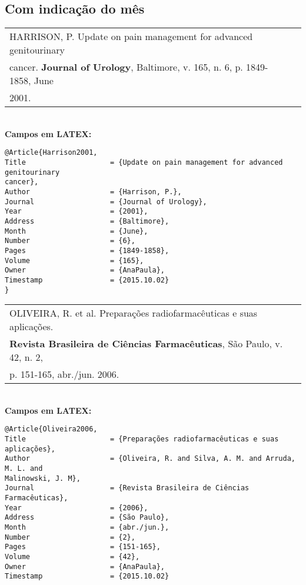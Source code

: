 \subsection{Com indicação do mês}

\begin{tabular}{|l|c|} \hline
HARRISON, P. Update on pain management for advanced genitourinary	\\cancer. \textbf{Journal of Urology}, Baltimore, v. 165, n. 6, p. 1849-1858, June \\2001. 
	\\\hline
\end{tabular} \\

\textbf{Campos em LATEX:} 

\begin{verbatim}
@Article{Harrison2001,
Title                    = {Update on pain management for advanced 
genitourinary 
cancer},
Author                   = {Harrison, P.},
Journal                  = {Journal of Urology},
Year                     = {2001},
Address                  = {Baltimore},
Month                    = {June},
Number                   = {6},
Pages                    = {1849-1858},
Volume                   = {165},
Owner                    = {AnaPaula},
Timestamp                = {2015.10.02}
}
\end{verbatim}

\begin{tabular}{|l|c|} \hline
OLIVEIRA, R. et al. Preparações radiofarmacêuticas e suas aplicações.\\
\textbf{Revista Brasileira de Ciências Farmacêuticas}, São Paulo, v. 42, n. 2,\\
p. 151-165, abr./jun. 2006. \\\hline
\end{tabular} \\

\textbf{Campos em LATEX:} 

\begin{verbatim}
@Article{Oliveira2006,
Title                    = {Preparações radiofarmacêuticas e suas 
aplicações},
Author                   = {Oliveira, R. and Silva, A. M. and Arruda, 
M. L. and 
Malinowski, J. M},
Journal                  = {Revista Brasileira de Ciências Farmacêuticas},
Year                     = {2006},
Address                  = {São Paulo},
Month                    = {abr./jun.},
Number                   = {2},
Pages                    = {151-165},
Volume                   = {42},
Owner                    = {AnaPaula},
Timestamp                = {2015.10.02}
\end{verbatim}

